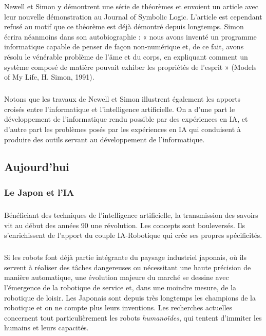 Newell et Simon y démontrent une série de théorèmes et envoient un article avec leur nouvelle démonstration au Journal of Symbolic Logic. L'article est cependant refusé au motif que ce théorème est déjà démontré depuis longtemps. Simon écrira néanmoins dans son autobiographie : « nous avons inventé un programme informatique capable de penser de façon non-numérique et, de ce fait, avons résolu le vénérable problème de l'âme et du corps, en expliquant comment un système composé de matière pouvait exhiber les propriétés de l'esprit » (Models of My Life, H.
Simon, 1991).

\subparagraph{}
Notons que les travaux de Newell et Simon illustrent également les apports croisés entre l'informatique et l'intelligence artificielle. On a d'une part le développement de l'informatique rendu possible par des expériences en IA, et d'autre part les problèmes posés par les expériences en IA qui conduisent à produire des outils servant au développement de l'informatique.

\subsection{Aujourd'hui}

\subsubsection{Le Japon et l'IA}

\subparagraph{}
Bénéficiant des techniques de l'intelligence artificielle, la transmission des savoirs vit au début des années 90 une révolution. Les concepts sont bouleversés. Ils s'enrichissent de l'apport du couple IA-Robotique qui crée ses propres spécificités.

\subparagraph{}
Si les robots font déjà partie intégrante du paysage industriel japonais, où ils servent à réaliser des tâches dangereuses ou nécessitant une haute précision de manière automatique, une évolution majeure du marché se dessine avec l’émergence de la robotique de service et, dans une moindre mesure, de la robotique de loisir.
Les Japonais sont depuis très longtemps les champions de la robotique et on ne compte plus leurs inventions. Les recherches actuelles concernent tout particulièrement les robots \textit{humanoïdes}, qui tentent d’immiter les humains et leurs capacités.

